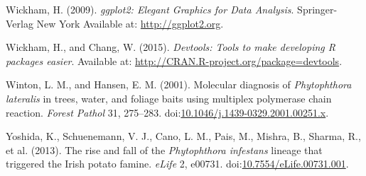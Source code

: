 \documentclass[double,12pt]{beavtex}
\begin{document}
  \hypertarget{ref-wickham2009ggplot2}{}
  Wickham, H. (2009). \emph{ggplot2: Elegant Graphics for Data Analysis}.
  Springer-Verlag New York Available at: \url{http://ggplot2.org}.
  
  \hypertarget{ref-wickham2015devtools}{}
  Wickham, H., and Chang, W. (2015). \emph{Devtools: Tools to make
  developing R packages easier}. Available at:
  \url{http://CRAN.R-project.org/package=devtools}.
  
  \hypertarget{ref-winton2001molecular}{}
  Winton, L. M., and Hansen, E. M. (2001). Molecular diagnosis of
  \emph{Phytophthora lateralis} in trees, water, and foliage baits using
  multiplex polymerase chain reaction. \emph{Forest Pathol} 31, 275--283.
  doi:\href{https://doi.org/10.1046/j.1439-0329.2001.00251.x}{10.1046/j.1439-0329.2001.00251.x}.
  
  \hypertarget{ref-yoshida2013rise}{}
  Yoshida, K., Schuenemann, V. J., Cano, L. M., Pais, M., Mishra, B.,
  Sharma, R., et al. (2013). The rise and fall of the \emph{Phytophthora
  infestans} lineage that triggered the Irish potato famine. \emph{eLife}
  2, e00731.
  doi:\href{https://doi.org/10.7554/eLife.00731.001}{10.7554/eLife.00731.001}.
\end{document}
